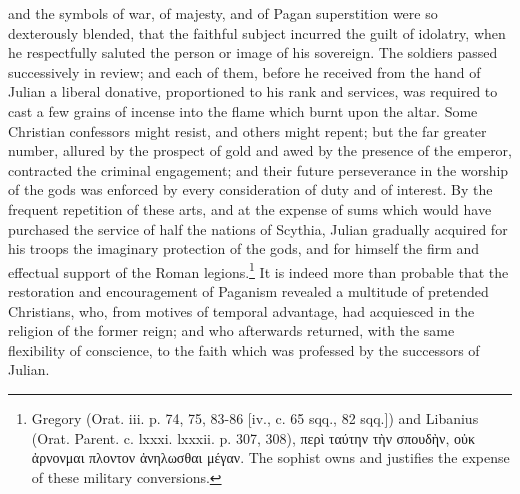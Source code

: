 and the symbols of war, of majesty, and of Pagan superstition were so dexterously blended, that the faithful subject incurred the guilt of idolatry, when he respectfully saluted the person or image of his sovereign. The soldiers passed successively in review; and each of them, before he received from the hand of Julian a liberal donative, proportioned to his rank and services, was required to cast a few grains of incense into the flame which burnt upon the altar. Some Christian confessors might resist, and others might repent; but the far greater number, allured by the prospect of gold and awed by the presence of the emperor, contracted the criminal engagement; and their future perseverance in the worship of the gods was enforced by every consideration of duty and of interest. By the frequent repetition of these arts, and at the expense of sums which would have purchased the service of half the nations of Scythia, Julian gradually acquired for his troops the imaginary protection of the gods, and for himself the firm and effectual support of the Roman legions.\footnote{Gregory (Orat. iii. p. 74, 75, 83-86 [iv., c. 65 sqq., 82 sqq.]) and Libanius (Orat. Parent. c. lxxxi. lxxxii. p. 307, 308), \textgreek{περ\texthebrew{ὶ} ταύτην τ\texthebrew{ὴ}ν σπουδ\texthebrew{ὴ}ν, ο\texthebrew{ὐ}κ \texthebrew{ἀ}ρνονμαι πλοντον \texthebrew{ἀ}νηλωσθαι μέγαν}. The sophist owns and justifies the expense of these military conversions.} It is indeed more than probable that the restoration and encouragement of Paganism revealed a multitude of pretended Christians, who, from motives of temporal advantage, had acquiesced in the religion of the former reign; and who afterwards returned, with the same flexibility of conscience, to the faith which was professed by the successors of Julian.

